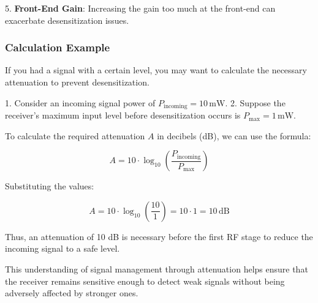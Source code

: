 5. \textbf{Front-End Gain}: Increasing the gain too much at the front-end can exacerbate desensitization issues.

\subsubsection*{ Calculation Example}

If you had a signal with a certain level, you may want to calculate the necessary attenuation to prevent desensitization. 

1. Consider an incoming signal power of \( P_{\text{incoming}} = 10 \, \text{mW} \).
2. Suppose the receiver's maximum input level before desensitization occurs is \( P_{\text{max}} = 1 \, \text{mW} \).

To calculate the required attenuation \( A \) in decibels (dB), we can use the formula:

\[
A = 10 \cdot \log_{10}\left(\frac{P_{\text{incoming}}}{P_{\text{max}}}\right)
\]

Substituting the values:

\[
A = 10 \cdot \log_{10}\left(\frac{10}{1}\right) = 10 \cdot 1 = 10 \, \text{dB}
\]

Thus, an attenuation of 10 dB is necessary before the first RF stage to reduce the incoming signal to a safe level.

This understanding of signal management through attenuation helps ensure that the receiver remains sensitive enough to detect weak signals without being adversely affected by stronger ones.
